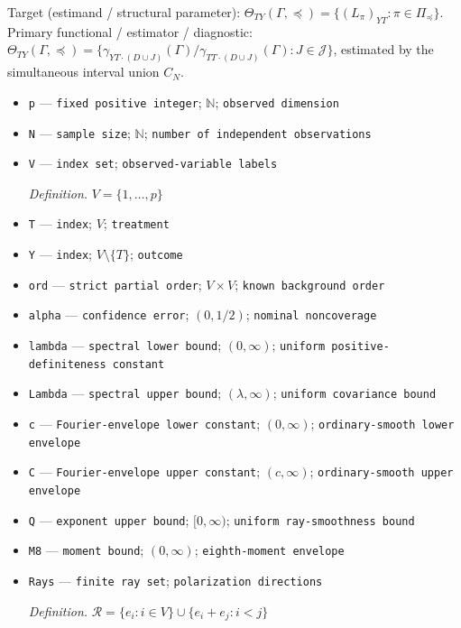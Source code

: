 \documentclass{article}
\begin{document}
Target (estimand / structural parameter): \(\Theta_{TY}(\Gamma,\preceq)=\{(L_\pi)_{YT}:\pi\in\Pi_{\preceq}\}\).
Primary functional / estimator / diagnostic: \(\Theta_{TY}(\Gamma,\preceq)=\{\gamma_{YT\cdot(D\cup J)}(\Gamma)/\gamma_{TT\cdot(D\cup J)}(\Gamma):J\in\mathcal J\}\), estimated by the simultaneous interval union \(C_N\).
\begin{itemize}
  \item \texttt{p} --- \texttt{fixed positive integer}; \(\mathbb N\); \texttt{observed dimension}
  \item \texttt{N} --- \texttt{sample size}; \(\mathbb N\); \texttt{number of independent observations}
  \item \texttt{V} --- \texttt{index set}; \texttt{observed-\allowbreak{}variable labels}
  \par\smallskip\noindent\emph{Definition.} \(V=\{1,\ldots,p\}\)
  \item \texttt{T} --- \texttt{index}; \(V\); \texttt{treatment}
  \item \texttt{Y} --- \texttt{index}; \(V\setminus\{T\}\); \texttt{outcome}
  \item \texttt{ord} --- \texttt{strict partial order}; \(V\times V\); \texttt{known background order}
  \item \texttt{alpha} --- \texttt{confidence error}; \((0,1/2)\); \texttt{nominal noncoverage}
  \item \texttt{lambda} --- \texttt{spectral lower bound}; \((0,\infty)\); \texttt{uniform positive-\allowbreak{}definiteness constant}
  \item \texttt{Lambda} --- \texttt{spectral upper bound}; \((\lambda,\infty)\); \texttt{uniform covariance bound}
  \item \texttt{c} --- \texttt{Fourier-\allowbreak{}envelope lower constant}; \((0,\infty)\); \texttt{ordinary-\allowbreak{}smooth lower envelope}
  \item \texttt{C} --- \texttt{Fourier-\allowbreak{}envelope upper constant}; \((c,\infty)\); \texttt{ordinary-\allowbreak{}smooth upper envelope}
  \item \texttt{Q} --- \texttt{exponent upper bound}; \([0,\infty)\); \texttt{uniform ray-\allowbreak{}smoothness bound}
  \item \texttt{M8} --- \texttt{moment bound}; \((0,\infty)\); \texttt{eighth-\allowbreak{}moment envelope}
  \item \texttt{Rays} --- \texttt{finite ray set}; \texttt{polarization directions}
  \par\smallskip\noindent\emph{Definition.} \(\mathcal R=\{e_i:i\in V\}\cup\{e_i+e_j:i<j\}\)

\end{itemize}
\end{document}
